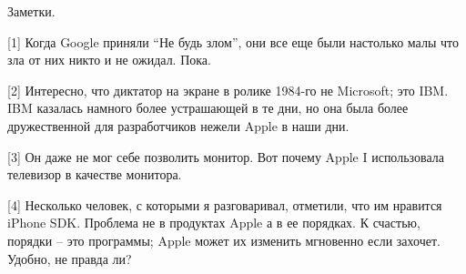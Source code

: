 \documentclass[ebook,12pt,oneside,openany]{memoir}
\begin{document}
Заметки.

[1] Когда Google приняли “Не будь злом”, они все еще были настолько
малы что зла от них никто и не ожидал. Пока.

[2] Интересно, что диктатор на экране в ролике 1984-го не Microsoft;
это IBM. IBM казалась намного более устрашающей в те дни, но она была
более дружественной для разработчиков нежели Apple в наши дни.

[3] Он даже не мог себе позволить монитор. Вот почему Apple I
использовала телевизор в качестве монитора.

[4] Несколько человек, с которыми я разговаривал, отметили, что им
нравится iPhone SDK. Проблема не в продуктах Apple а в ее порядках. К
счастью, порядки – это программы; Apple может их изменить мгновенно
если захочет. Удобно, не правда ли?
\end{document}
